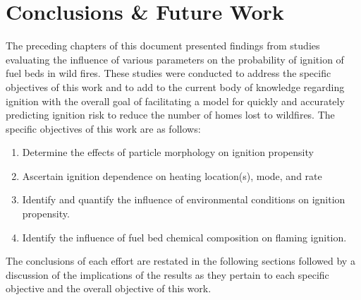 
\chapter{Conclusions \& Future Work}
\label{chap:conclusion}
The preceding chapters of this document presented findings from studies evaluating the influence of various parameters on the probability of ignition of fuel beds in wild fires. These studies were conducted to address the specific objectives of this work and to add to the current body of knowledge regarding ignition with the overall goal of facilitating a model for quickly and accurately predicting ignition risk to reduce the number of homes lost to wildfires. The specific objectives of this work are as follows:
        \begin{enumerate}
            \item Determine the effects of particle morphology on ignition propensity
            \item Ascertain ignition dependence on heating location(s), mode, and rate
            \item Identify and quantify the influence of environmental conditions on ignition propensity.
            \item Identify the influence of fuel bed chemical composition on flaming ignition.
        \end{enumerate}
The conclusions of each effort are restated in the following sections followed by a discussion of the implications of the results as they pertain to each specific objective and the overall objective of this work.

